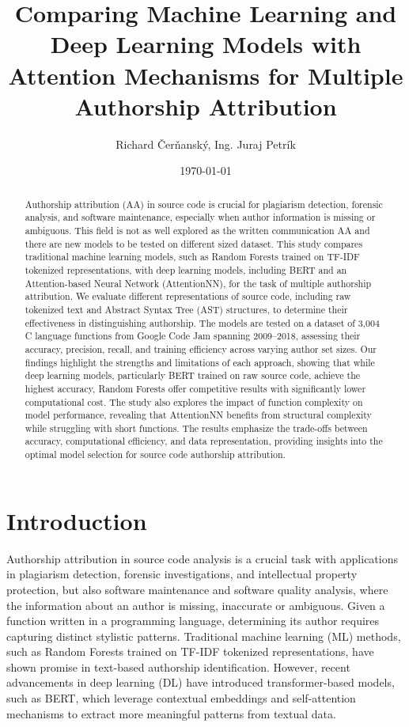 \documentclass{article}
\title{Comparing Machine Learning and Deep Learning Models with Attention Mechanisms for Multiple Authorship Attribution}
\author{Richard Čerňanský, Ing. Juraj Petrík}
\date{\today}
\begin{document}
\maketitle

\begin{abstract}
    Authorship attribution (AA) in source code is crucial for plagiarism detection, 
    forensic analysis, and software maintenance, especially when author 
    information is missing or ambiguous. This field is not as well explored 
    as the written communication AA and there are new models to be tested 
    on different sized dataset. This study compares traditional 
    machine learning models, such as Random Forests trained on TF-IDF 
    tokenized representations, with deep learning models, including BERT 
    and an Attention-based Neural Network (AttentionNN), for the task of 
    multiple authorship attribution. We evaluate different representations 
    of source code, including raw tokenized text and Abstract Syntax Tree (AST) 
    structures, to determine their effectiveness in distinguishing authorship. 
    The models are tested on a dataset of 3,004 C language functions from 
    Google Code Jam spanning 2009–2018, assessing their accuracy, precision, 
    recall, and training efficiency across varying author set sizes. 
    Our findings highlight the strengths and limitations of each approach, 
    showing that while deep learning models, particularly BERT trained on 
    raw source code, achieve the highest accuracy, Random Forests offer 
    competitive results with significantly lower computational cost. 
    The study also explores the impact of function complexity on model 
    performance, revealing that AttentionNN benefits from structural 
    complexity while struggling with short functions. The results emphasize 
    the trade-offs between accuracy, computational efficiency, and data 
    representation, providing insights into the optimal model selection 
    for source code authorship attribution.   
\end{abstract}

\section{Introduction}

Authorship attribution in source code analysis is a crucial task 
with applications in plagiarism detection, forensic investigations, and 
intellectual property protection, but also software maintenance
and software quality analysis, where the information about an author 
is missing, inaccurate or ambiguous.
Given a function written in a programming
language, determining its author requires capturing distinct stylistic 
patterns. Traditional machine learning (ML) methods, such as Random 
Forests trained on TF-IDF tokenized representations, have shown promise 
in text-based authorship identification. However, recent advancements 
in deep learning (DL) have introduced transformer-based models, such as 
BERT, which leverage contextual embeddings and self-attention mechanisms 
to extract more meaningful patterns from textual data.
\end{document}
